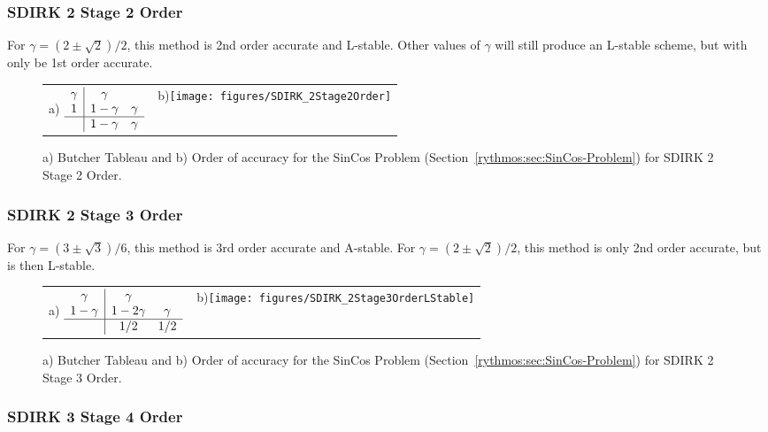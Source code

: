\subsubsection{SDIRK 2 Stage 2 Order}

For $\gamma=(2\pm\sqrt{2})/2$, this method is 2nd order accurate
and L-stable. Other values of $\gamma$ will still produce an L-stable
scheme, but with only be 1st order accurate.

\begin{figure}[H]
\centering{}%
\begin{tabular}{cc}
a) $\begin{array}{c|cc}
\gamma & \gamma\\
1 & 1-\gamma & \gamma\\
\hline  & 1-\gamma & \gamma
\end{array}$ & b)\texttt{[image: figures/SDIRK\_2Stage2Order]}\tabularnewline
\end{tabular}\caption{a) Butcher Tableau and b) Order of accuracy for the SinCos Problem
(Section~\ref{rythmos:sec:SinCos-Problem}) for SDIRK 2 Stage 2 Order.}
\end{figure}


\subsubsection{SDIRK 2 Stage 3 Order}

For $\gamma=(3\pm\sqrt{3})/6$, this method is 3rd order accurate
and A-stable. For $\gamma=(2\pm\sqrt{2})/2$, this method is only
2nd order accurate, but is then L-stable.

\begin{figure}[H]
\centering{}%
\begin{tabular}{cc}
a) $\begin{array}{c|cc}
\gamma & \gamma\\
1-\gamma & 1-2\gamma & \gamma\\
\hline  & 1/2 & 1/2
\end{array}$ & b)\texttt{[image: figures/SDIRK\_2Stage3OrderLStable]}\tabularnewline
\end{tabular}\caption{a) Butcher Tableau and b) Order of accuracy for the SinCos Problem
(Section~\ref{rythmos:sec:SinCos-Problem}) for SDIRK 2 Stage 3 Order.}
\end{figure}


\subsubsection{SDIRK 3 Stage 4 Order}

